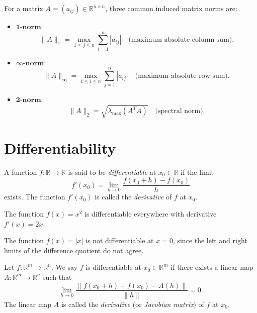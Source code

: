 \begin{example}
For a matrix $A = (a_{ij}) \in \mathbb{R}^{n \times n}$, three common induced matrix norms are:
\begin{itemize}
    \item $\mathbf{1\text{-norm}}$:  
    \[
    \|A\|_1 = \max_{1 \leq j \leq n} \sum_{i=1}^n |a_{ij}| 
    \quad \text{(maximum absolute column sum)}.
    \]
    \item $\mathbf{\infty\text{-norm}}$:  
    \[
    \|A\|_\infty = \max_{1 \leq i \leq n} \sum_{j=1}^n |a_{ij}| 
    \quad \text{(maximum absolute row sum)}.
    \]
    \item $\mathbf{2\text{-norm}}$:  
    \[
    \|A\|_2 = \sqrt{\lambda_{\max}(A^TA)}
    \quad \text{(spectral norm)}.
    \]
\end{itemize}
\end{example}

\section{Differentiability}

\begin{definition}
A function $f:\mathbb{R}\to \mathbb{R}$ is said to be \emph{differentiable} at $x_0\in \mathbb{R}$ if the limit
\[
f'(x_0) = \lim_{h\to 0} \frac{f(x_0+h)-f(x_0)}{h}
\]
exists. The function $f'(x_0)$ is called the \emph{derivative} of $f$ at $x_0$.
\end{definition}

\begin{example}
The function $f(x)=x^2$ is differentiable everywhere with derivative $f'(x)=2x$.
\end{example}

\begin{example}
The function $f(x)=|x|$ is not differentiable at $x=0$, since the left and right limits of the difference quotient do not agree.
\end{example}


\begin{definition}
Let $f:\mathbb{R}^m\to \mathbb{R}^n$. We say $f$ is differentiable at $x_0\in \mathbb{R}^m$ if there exists a linear map 
$A:\mathbb{R}^m\to \mathbb{R}^n$ such that
\[
\lim_{h\to 0}\frac{\|f(x_0+h)-f(x_0)-A(h)\|}{\|h\|} = 0.
\]
The linear map $A$ is called the \emph{derivative} (or \emph{Jacobian matrix}) of $f$ at $x_0$.
\end{definition}

